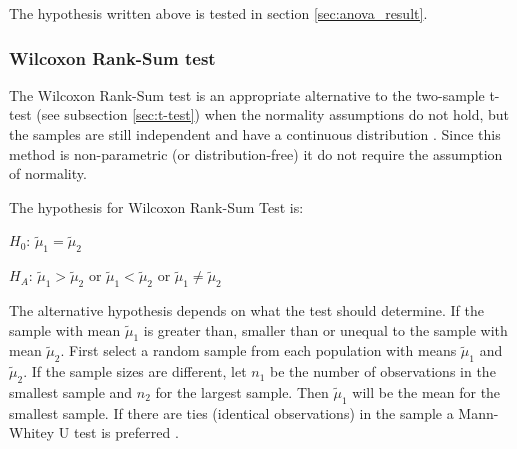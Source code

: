 The hypothesis written above is tested in section \ref{sec:anova_result}. %


\subsubsection[Wilcoxon]{Wilcoxon Rank-Sum test}\label{sec:Wilcoxon}
The Wilcoxon Rank-Sum test is an appropriate alternative to the two-sample t-test (see subsection \ref{sec:t-test}) when the normality assumptions do not hold, but the samples are still independent and have a continuous distribution \citep{Walpole2012}. Since this method is non-parametric (or distribution-free) it do not require the assumption of normality. 

The hypothesis for Wilcoxon Rank-Sum Test is:\newline

\centerline{$H_{0}$:  $\tilde{\mu}_{1} =  \tilde{\mu}_{2} $} 
\centerline{$H_{A}$: $\tilde{\mu}_{1} >  \tilde{\mu}_{2} $ or $\tilde{\mu}_{1} <  \tilde{\mu}_{2} $ or $\tilde{\mu}_{1} \neq  \tilde{\mu}_{2} $}

The alternative hypothesis depends on what the test should determine. If the sample with mean $\tilde{\mu}_1$ is greater than, smaller than or unequal to the sample with mean $\tilde{\mu}_2$.  First select a random sample from each population with means $\tilde{\mu}_{1} $ and $ \tilde{\mu}_{2} $. If the sample sizes are different, let $n_{1}$ be the number of observations in the smallest sample and $n_{2}$ for the largest sample. Then $\tilde{\mu}_1$ will be the mean for the smallest sample. If there are ties (identical observations) in the sample a Mann-Whitey U test is preferred \citep{TheScipycommunity2017}. 

